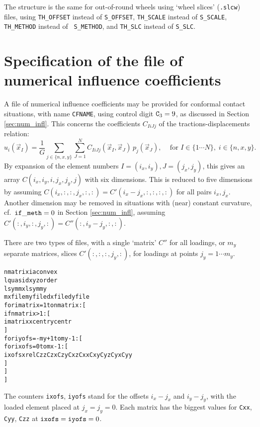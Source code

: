 \documentclass[12pt]{report}
\begin{document}
The structure is the same for out-of-round wheels using `wheel slices'
({\tt .slcw}) files, using {\tt TH\_\-OFF\-SET} instead of {\tt S\_OFFSET},
{\tt TH\_SCALE} instead of {\tt S\_SCALE}, {\tt TH\_METHOD} instead of {\tt
S\_METHOD}, and {\tt TH\_SLC} instead of {\tt S\_SLC}.

\section{Specification of the file of numerical influence coefficients}
\label{sec:spec_inflcf}

A file of numerical influence coefficients may be provided for conformal
contact situations, with name {\tt CFNAME}, using control digit
${\tt C}_3=9$, as discussed in Section \ref{sec:num_infl}. This concerns
the coefficients $C_{IiJj}$ of the tractions-displacements relation:
\begin{equation}\label{eq:ui_sum_Cij_pj}
    u_i(\vec{x}_I) = \frac{1}{G} \sum_{j\in\{n,x,y\}}\sum_{J=1}^N
        C_{IiJj}(\vec{x}_I,\vec{x}_J) \, p_j(\vec{x}_J), \;\;\;
        \mbox{ for } I\in\{1\cdots N\}, \; i\in \{n,x,y\}.
\end{equation}
By expansion of the element numbers $I=(i_x,i_y), J=(j_x,j_y)$, this gives
an array $C(i_x,i_y,i,j_x,j_y,j)$ with six dimensions. This is reduced to five
dimensions by assuming $C(i_x,:,:,j_x,:,:)=C'(i_x-j_x,:,:,:,:)$ for all
pairs $i_x,j_x$. Another dimension may be removed in situations with
(near) constant curvature, cf.\ ${\tt if\_meth}=0$ in Section
\ref{sec:num_infl}, assuming $C'(:,i_y,:,j_y,:)=C''(:,i_y-j_y,:,:)$.

There are two types of files, with a single `matrix' $C''$ for all
loadings, or $m_y$ separate matrices, slices $C'(:,:,:,j_y,:)$, for
loadings at points $j_y=1\cdots m_y$.
\begin{alltt}
   nmatrix   iaconvex
   lquasid   xyzorder
   lsymmx    lsymmy
   mxfile    myfile   dxfile  dyfile
   % empty/comment line
   % empty/comment line
   for imatrix = 1 to nmatrix: [
      if nmatrix>1: [
         % empty/comment line
         imatrix  xcentr  ycentr
      ]
      for iyofs = -my+1 to my-1: [
         % empty/comment line
         % empty/comment line
         for ixofs = 0 to mx-1: [
            ixofs   xrel   Czz  Czx  Czy   Cxz  Cxx  Cxy   Cyz  Cyx  Cyy 
         ]
      ]
   ]
\end{alltt}
The counters {\tt ixofs}, {\tt iyofs} stand for the offsets $i_x-j_x$ and
$i_y-j_y$, with the loaded element placed at $j_x=j_y=0$. Each matrix has
the biggest values for {\tt Cxx}, {\tt Cyy}, {\tt Czz} at ${\tt ixofs}=
{\tt iyofs}=0$.
\end{document}
